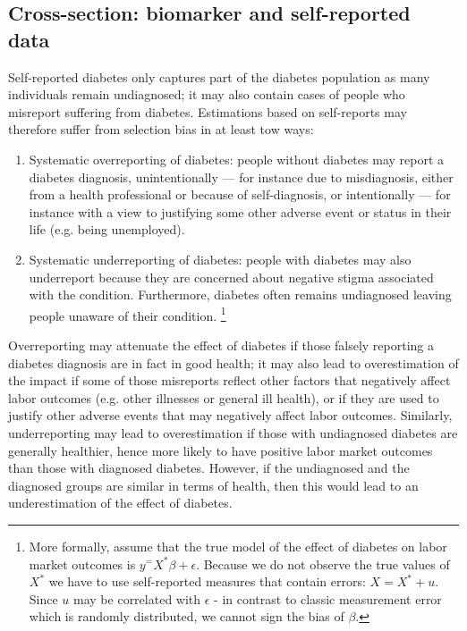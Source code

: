 \documentclass[12pt,english]{article}
\begin{document}
{\subsection{\label{sec:Biomarker Strategy}Cross-section: biomarker and self-reported data}

Self-reported diabetes only captures part of the diabetes population as many individuals remain undiagnosed; it may also contain cases of people who misreport suffering from diabetes.  Estimations based on self-reports may therefore suffer from selection bias in at least tow ways:

\begin{enumerate}
\item Systematic overreporting of diabetes: people without diabetes
may report a diabetes diagnosis, unintentionally --- for instance due to misdiagnosis, either from a health professional or because of self-diagnosis, or intentionally --- for instance with a view to justifying some other adverse event or status in their life (e.g. being unemployed). 
\item Systematic underreporting of diabetes: people with diabetes may also underreport because they are concerned about negative stigma associated with the condition. Furthermore, diabetes often remains undiagnosed leaving people unaware of their condition.
\footnote{More formally, assume that the true model of the effect of diabetes on labor market outcomes is $y^=X^{*}\beta+\epsilon$. Because we do not observe the true values of  $X^{*}$  we have to use self-reported measures that contain errors: $X=X^{*} + u$. Since $u$ may be correlated with $\epsilon$ - in contrast to classic measurement error which is randomly distributed, we cannot sign the bias of  $\beta$.} 

\end{enumerate} 

Overreporting may attenuate the effect of diabetes if those falsely reporting a diabetes diagnosis are in fact in good health; it may also lead to overestimation of the impact if some of those misreports reflect other factors that negatively affect labor outcomes (e.g. other illnesses or general ill health), or if they are used to justify other adverse events that may negatively affect labor outcomes. Similarly, underreporting may lead to overestimation if those with undiagnosed diabetes are generally healthier, hence more likely to have positive labor market outcomes than those with diagnosed diabetes. However, if the undiagnosed and the diagnosed groups are similar in terms of health, then this would lead to an underestimation of the effect of diabetes. 

}
\end{document}
